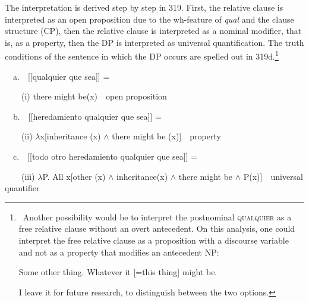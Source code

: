 \begin{styleStandard}
The interpretation is derived step by step in 319. First, the relative clause is interpreted as an open proposition due to the wh-feature of \textit{qual} and the clause structure (CP), then the relative clause is interpreted as a nominal modifier, that is, as a property, then the DP is interpreted as universal quantification. The truth conditions of the sentence in which the DP occurs are spelled out in 319d.\footnote{\textrm{\ Another possibility would be to interpret the postnominal }\textrm{\textsc{qualquier}}\textrm{ as a free relative clause without an overt antecedent. On this analysis, one could interpret the free relative clause as a proposition with a discourse variable and not as a property that modifies an antecedent NP:}\par 
\setcounter{listWWNumxxiileveli}{0}
\begin{listWWNumxxiileveli}
\item 
\begin{styleFootnote}
\textrm{Some other thing. Whatever it [=this thing] might be.}
\end{styleFootnote}
\end{listWWNumxxiileveli}
\par \textrm{I leave it for future research, to distinguish between the two options. }}
\end{styleStandard}

\begin{styleAuthor}
\ \ a.\ \ [[qualquier que sea]] =\ \ 
\end{styleAuthor}

\begin{styleAuthor}
\ \ \ \ (i) there might be(x)\ \ open proposition
\end{styleAuthor}

\begin{styleStandard}
\ \ b.\ \ [[heredamiento qualquier que sea]] =\textbf{\ \ }
\end{styleStandard}

\begin{styleStandard}
\ \ \ \ (ii) $\lambda $x[inheritance (x) ${\wedge}$ there might be (x)]\ \ property
\end{styleStandard}

\begin{styleStandard}
\ \ c.\ \ [[todo otro heredamiento qualquier que sea]] =\ \ 
\end{styleStandard}

\begin{styleStandard}
\ \ \ \ (iii) $\lambda $P. All x[other (x) ${\wedge}$ inheritance(x) ${\wedge}$ there might be ${\wedge}$ P(x)]\ \ universal quantifier
\end{styleStandard}

